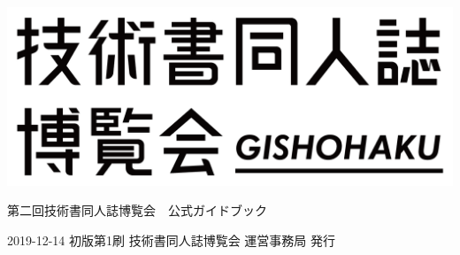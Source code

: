 \clearpage{\thispagestyle{empty}}
\begin{center}

\includegraphics[width=0.75\linewidth]{images/chap-title/logo.png}
\vspace{80pt}

\begin{sffamily}
\Large
第二回技術書同人誌博覧会　公式ガイドブック
\normalsize
\end{sffamily}
\vspace{320pt}

\begin{sffamily}
2019-12-14
\hspace{5pt}
初版第1刷
\hspace{5pt}
技術書同人誌博覧会 運営事務局
\hspace{5pt}
発行
\end{sffamily}

\end{center}
